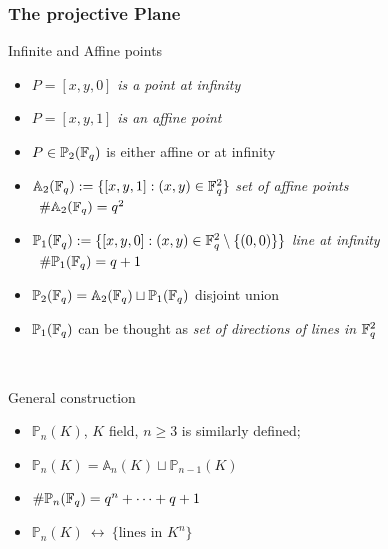 \documentclass[10pt,handout]{beamer} %
\begin{document}
\begin{frame}
\frametitle{The projective Plane}

\begin{beamerboxesrounded}[upper=block title example,lower=block body example,shadow=true]{Infinite and Affine points}
 \begin{itemize}[<+-| alert@+>]
\item $P=[x,y,0]$ \hfill \emph{is a point at infinity}
\item $P=[x,y,1]$ \hfill \emph{is an affine point}
\item $P\in\mathbb P_2(\mathbb F_q)$ is either affine or at infinity
\item $\mathbb A_2(\mathbb F_q):=\{[x,y,1]: (x,y)\in\mathbb F_q^2\}$ \hfill \emph{set of affine points}\\
\ \hfill\small{$\#\mathbb A_2(\mathbb F_q)=q^2$}
\item $\mathbb P_1(\mathbb F_q):=\{[x,y,0]: (x,y)\in\mathbb F_q^2\setminus\{(0,0)\}\}$ \hfill \emph{line at infinity}\\
\ \hfill\small{$\#\mathbb P_1(\mathbb F_q)=q+1$}
\item $\mathbb P_2(\mathbb F_q)=\mathbb A_2(\mathbb F_q)\sqcup\mathbb P_1(\mathbb F_q)$ \hfill  disjoint union
\item $\mathbb P_1(\mathbb F_q)$ can be thought as \emph{ set of directions of lines in $\mathbb F_q^2$}
\end{itemize}
\end{beamerboxesrounded}
\pause

\ \hfill
\begin{beamerboxesrounded}[upper=block title,lower=block body,shadow=true]{General construction}
  \begin{itemize}[<+-| alert@+>]
   \item $\mathbb P_n(K)$, $K$ field, $n\ge3$ is similarly defined;
   \item $\mathbb P_n(K)=\mathbb A_n(K)\sqcup\mathbb P_{n-1}(K)$
   \item $\#\mathbb P_n(\mathbb F_q)=q^n+\cdots+q+1$
   \item $\mathbb P_n(K)\ \longleftrightarrow\ \{\text{lines in }K^n\}$
  \end{itemize}
\end{beamerboxesrounded}
\end{frame}
\end{document}
